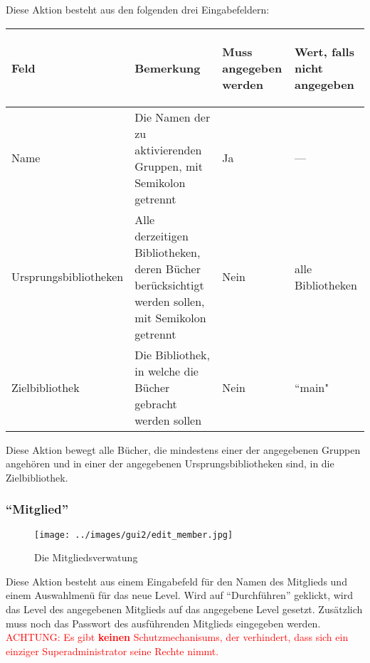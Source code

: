 Diese Aktion besteht aus den folgenden drei Eingabefeldern:

\begin{tabular}{|p{}|p{}|p{}|p{}|}\hline
\begin{center}Feld\end{center} & \begin{center}Bemerkung\end{center} & \begin{center}Muss angegeben werden\end{center} & \begin{center}Wert, falls nicht angegeben\end{center}\\
\hline
Name & Die Namen der zu aktivierenden Gruppen, mit Semikolon getrennt & Ja &  ---\\
\hline
Ur\-sprungs\-bib\-li\-othe\-ken & Alle derzeitigen Bibliotheken, deren Bücher berücksichtigt werden sollen, mit Semikolon getrennt & Nein & alle Bibliotheken\\
\hline
Ziel\-bibliothek & Die Bibliothek, in welche die Bücher gebracht werden sollen & Nein & ``main"\\
\hline
\end{tabular}

Diese Aktion bewegt alle Bücher, die mindestens einer der angegebenen Gruppen angehören und in einer der angegebenen Ursprungsbibliotheken sind, in die Zielbibliothek.

\subsubsection{``Mitglied''}
\label{subsubsec:detail:edit:member}
\begin{figure}\texttt{[image: ../images/gui2/edit\_member.jpg]}\caption{Die Mitgliedsverwatung}\label{fig:edit_member}\end{figure}

Diese Aktion besteht aus einem Eingabefeld für den Namen des Mitglieds und einem Auswahlmenü für das neue Level. Wird auf ``Durchführen'' geklickt, wird das Level des angegebenen Mitglieds auf das angegebene Level gesetzt. Zusätzlich muss noch das Passwort des ausführenden Mitglieds eingegeben werden. \\

\textcolor{red}{ACHTUNG: Es gibt \textbf{keinen} Schutzmechanisums, der verhindert, dass sich ein einziger Superadministrator seine Rechte nimmt.}


